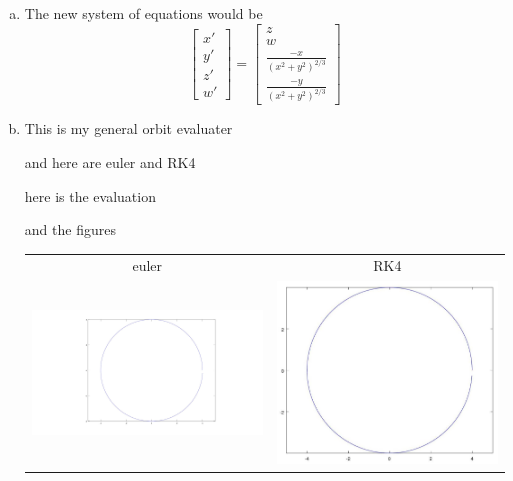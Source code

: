 \documentclass[12pt]{article}
\theoremstyle{homework}
\begin{document}
\begin{enumerate}[(a)]
\item
The new system of equations would be 
$$\begin{bmatrix}
x'\\
y'\\
z'\\
w'
\end{bmatrix}
=
\begin{bmatrix}
z\\
w\\
\frac{-x}{(x^2+y^2)^{2/3}}\\
\frac{-y}{(x^2+y^2)^{2/3}}
\end{bmatrix}$$
\item
This is my general orbit evaluater

and here are euler and RK4


here is the evaluation

and the figures\\
\begin{tabular}{c c}
euler & RK4\\
\includegraphics[scale=.15]{../octave/f2.jpg} & \includegraphics[scale=.3]{../octave/f3.jpg}

\end{tabular}
\end{enumerate}
\end{document}
